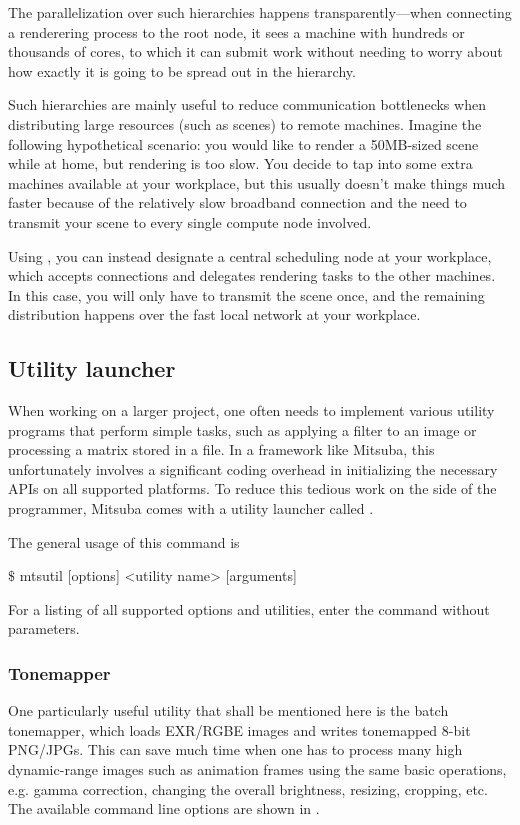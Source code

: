 The parallelization over such hierarchies happens transparently---when 
connecting a renderering process to the root node, it sees a machine 
with hundreds or thousands of cores, to which it can submit work without
needing to worry about how exactly it is going to be spread out in 
the hierarchy.

Such hierarchies are mainly useful to reduce communication bottlenecks when distributing
large resources (such as scenes) to remote machines. Imagine the following hypothetical scenario:
you would like to render a 50MB-sized scene while at home, but rendering is too slow. 
You decide to tap into some extra machines available
at your workplace, but this usually doesn't make things much faster because of the relatively slow broadband
connection and the need to transmit your scene to every single compute node involved. 

Using , you can
instead designate a central scheduling node at your workplace, which accepts connections and delegates
rendering tasks to the other machines. In this case, you will only have to transmit the scene once,
and the remaining distribution happens over the fast local network at your workplace.
\subsection{Utility launcher}
\label{sec:mtsutil}
When working on a larger project, one often needs to implement various utility programs that 
perform simple tasks, such as applying a filter to an image or processing
a matrix stored in a file. In a framework like Mitsuba, this unfortunately involves 
a significant coding overhead in initializing the necessary APIs on all supported platforms. 
To reduce this tedious work on the side of the programmer, Mitsuba comes with a utility launcher
called .

The general usage of this command is
\begin{shell}
$\texttt{\$}$ mtsutil [options] <utility name> [arguments]
\end{shell}
For a listing of all supported options and utilities, enter the command without parameters.

\subsubsection{Tonemapper}
\label{sec:tonemapper}
One particularly useful utility that shall be mentioned here is the batch tonemapper, which
loads EXR/RGBE images and writes tonemapped 8-bit PNG/JPGs. This can save much time when one has to
process many high dynamic-range images such as animation frames using the same basic operations, 
e.g. gamma correction, changing the overall brightness, resizing, cropping, etc. The available
command line options are shown in .

